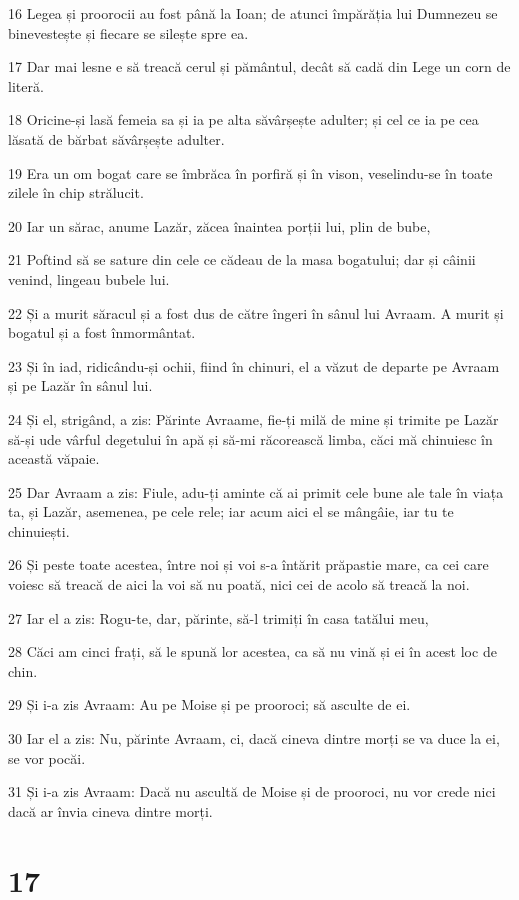 \par 16 Legea și proorocii au fost până la Ioan; de atunci împărăția lui Dumnezeu se binevestește și fiecare se silește spre ea.
\par 17 Dar mai lesne e să treacă cerul și pământul, decât să cadă din Lege un corn de literă.
\par 18 Oricine-și lasă femeia sa și ia pe alta săvârșește adulter; și cel ce ia pe cea lăsată de bărbat săvârșește adulter.
\par 19 Era un om bogat care se îmbrăca în porfiră și în vison, veselindu-se în toate zilele în chip strălucit.
\par 20 Iar un sărac, anume Lazăr, zăcea înaintea porții lui, plin de bube,
\par 21 Poftind să se sature din cele ce cădeau de la masa bogatului; dar și câinii venind, lingeau bubele lui.
\par 22 Și a murit săracul și a fost dus de către îngeri în sânul lui Avraam. A murit și bogatul și a fost înmormântat.
\par 23 Și în iad, ridicându-și ochii, fiind în chinuri, el a văzut de departe pe Avraam și pe Lazăr în sânul lui.
\par 24 Și el, strigând, a zis: Părinte Avraame, fie-ți milă de mine și trimite pe Lazăr să-și ude vârful degetului în apă și să-mi răcorească limba, căci mă chinuiesc în această văpaie.
\par 25 Dar Avraam a zis: Fiule, adu-ți aminte că ai primit cele bune ale tale în viața ta, și Lazăr, asemenea, pe cele rele; iar acum aici el se mângâie, iar tu te chinuiești.
\par 26 Și peste toate acestea, între noi și voi s-a întărit prăpastie mare, ca cei care voiesc să treacă de aici la voi să nu poată, nici cei de acolo să treacă la noi.
\par 27 Iar el a zis: Rogu-te, dar, părinte, să-l trimiți în casa tatălui meu,
\par 28 Căci am cinci frați, să le spună lor acestea, ca să nu vină și ei în acest loc de chin.
\par 29 Și i-a zis Avraam: Au pe Moise și pe prooroci; să asculte de ei.
\par 30 Iar el a zis: Nu, părinte Avraam, ci, dacă cineva dintre morți se va duce la ei, se vor pocăi.
\par 31 Și i-a zis Avraam: Dacă nu ascultă de Moise și de prooroci, nu vor crede nici dacă ar învia cineva dintre morți.

\chapter{17}


